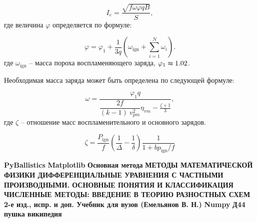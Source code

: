 \documentclass[14pt, a4paper]{extreport} %
\begin{document}
\begin{equation}
I_e = \frac{\sqrt{f \omega \varphi q B}}{S},
\end{equation}
где величина $\varphi$ определяется по формуле:

\begin{equation}
\varphi = \varphi_1 + \frac{1}{3q} \left( \omega_{\text{ign}} + \sum_{i=1}^{N} \omega_i \right).
\end{equation}
где $\omega_\text{ign}$ -- масса пороха воспламеняющего заряда, $\varphi_1 \thickapprox  1.02$.

Необходимая масса заряда может быть определена по следующей формуле: 

\begin{equation}
    \omega = \frac{\varphi_1 q}{\dfrac{2f}{(k-1)\ v^2_{pm}} \eta_{rm} - \frac{\zeta + 1}{3}},
\end{equation}
где $\zeta$ -- отношение масс воспламенительного и основного зарядов.

\begin{equation}
\zeta = \frac{P_{\mathrm{ign}}}{f} \left( \frac{1}{\Delta} - \frac{1}{\delta} \right) \frac{1}{1 + b p_{\mathrm{ign}} / f}
\end{equation}

\newpage
\begin{thebibliography}{9}
\bibitem{} \textbf{PyBallistics}
\bibitem{} \textbf{Matplotlib} 
\bibitem{} \textbf{Основная метода} 
\bibitem{} \textbf{МЕТОДЫ МАТЕМАТИЧЕСКОЙ ФИЗИКИ 
ДИФФЕРЕНЦИАЛЬНЫЕ УРАВНЕНИЯ 
С ЧАСТНЫМИ ПРОИЗВОДНЫМИ. 
ОСНОВНЫЕ ПОНЯТИЯ И КЛАССИФИКАЦИЯ } 
\bibitem{} \textbf{ЧИСЛЕННЫЕ МЕТОДЫ: ВВЕДЕНИЕ В ТЕОРИЮ РАЗНОСТНЫХ СХЕМ 2-е изд., испр. и доп. Учебник для вузов (Емельянов В. Н.)} 
\bibitem{} \textbf{Numpy}
\bibitem{} \textbf{Д44 пушка википедия}
\end{thebibliography}
\end{document}

